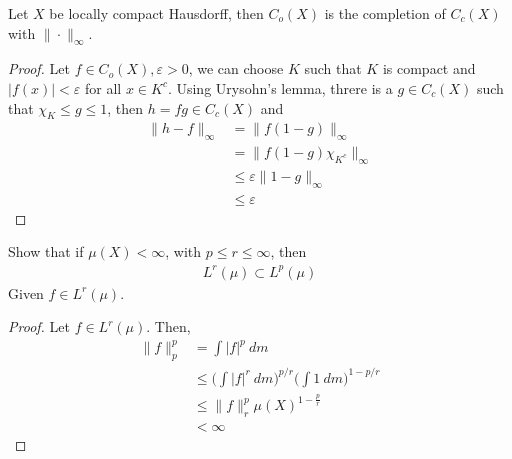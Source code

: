 \begin{theorem}
  Let $X$ be locally compact Hausdorff, then $C_o(X)$ is the
  completion of $C_c(X)$ with $\|\cdot\|_\infty$.
\end{theorem}
\begin{proof}
  Let $f \in C_o(X), \varepsilon > 0$, we can choose $K$ such that
  $K$ is compact and $|f(x)| < \varepsilon$ for all $x \in K^c$.
  Using Urysohn's lemma, threre is a $g \in C_c(X)$ such that $\chi_K
  \le g \le 1$, then $h = fg \in C_c(X)$ and
  \begin{align*}
    \|h - f\|_\infty &= \|f(1 - g)\|_\infty \\
    &= \|f(1-g) \chi_{K^c}\|_\infty \\
    &\le \varepsilon \|1 -g\|_\infty \\
    &\le \varepsilon
  \end{align*}
\end{proof}

\begin{proposition}
  Show that if $\mu(X) < \infty$, with $p \le r \le \infty$, then
  \begin{align*}
    L^r(\mu) \subset L^p(\mu)
  \end{align*}
  Given $f \in L^r(\mu)$.
\end{proposition}
\begin{proof}
  Let $f \in L^r(\mu)$. Then,
  \begin{align*}
    \|f\|_p^p &= \int |f|^p \ d m \\
    &\le \Bigg(\int |f|^{r} \ d m \Bigg) ^{p/r} \Bigg(\int 1 \ d
    m\Bigg)^{1 - p/r} \\
    &\le \|f\|_r^p \mu(X)^{1- \frac{p}{r}} \\
    &< \infty
  \end{align*}
\end{proof}


